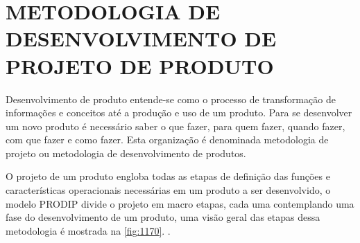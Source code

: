 %
%
%
%

\section{METODOLOGIA DE DESENVOLVIMENTO DE PROJETO DE PRODUTO}

Desenvolvimento de produto entende-se como o processo de transformação de informações e conceitos até a produção e uso de um produto. Para se desenvolver um novo produto
é necessário saber o que fazer, para quem fazer, quando fazer, com que fazer e como fazer. Esta organização é denominada metodologia de projeto ou metodologia de
desenvolvimento de produtos. \autocite{Back2008}

O projeto de um produto engloba todas as etapas de definição das funções e características operacionais necessárias em um produto a ser desenvolvido, o modelo PRODIP
divide o projeto em macro etapas, cada uma contemplando uma fase do desenvolvimento de um produto, uma visão geral das etapas dessa metodologia é mostrada na \autoref{fig:1170}.
\autocite{PRODIP}.

